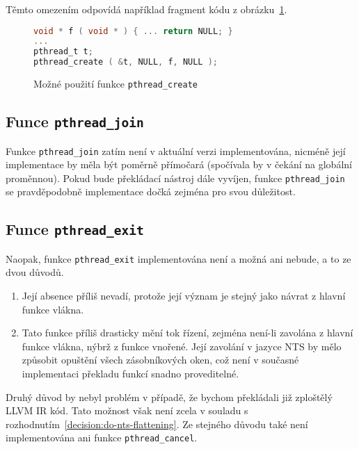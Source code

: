 \documentclass[12pt]{fithesis2}
\begin{document}
Těmto omezením odpovídá například fragment kódu z obrázku~\ref{fig:pthread-create-usage-c}.
\begin{figure}[h!]
\begin{lstlisting}[language=C]
void * f ( void * ) { ... return NULL; }
...
pthread_t t;
pthread_create ( &t, NULL, f, NULL );
\end{lstlisting}
\caption{Možné použití funkce \texttt{pthread\_create}}
\label{fig:pthread-create-usage-c}
\end{figure}

\subsection{Funce \texttt{pthread\_join}}
Funkce \texttt{pthread\_join} zatím není v aktuální verzi implementována, nicméně její implementace by měla být poměrně přímočará (spočívala by v čekání na globální proměnnou). Pokud bude překládací nástroj dále vyvíjen, funkce \texttt{pthread\_join} se pravděpodobně implementace dočká zejména pro svou důležitost.

\subsection{Funce \texttt{pthread\_exit}}
Naopak, funkce \texttt{pthread\_exit} implementována není a možná ani nebude, a to ze dvou důvodů.
\begin{enumerate}
\item Její absence příliš nevadí, protože její význam je stejný jako návrat z hlavní funkce vlákna.
\item Tato funkce příliš drasticky mění tok řízení, zejména není-li zavolána z hlavní funkce vlákna, nýbrž z funkce vnořené. Její zavolání v jazyce NTS by mělo způsobit opuštění všech zásobníkových oken, což není v současné implementaci překladu funkcí snadno proveditelné.
\end{enumerate}
Druhý důvod by nebyl problém v případě, že bychom překládali již zploštělý LLVM IR kód. Tato možnost však není zcela v souladu s rozhodnutím~\ref{decision:do-nts-flattening}. Ze stejného důvodu také není implementována ani funkce \texttt{pthread\_cancel}.

\end{document}
